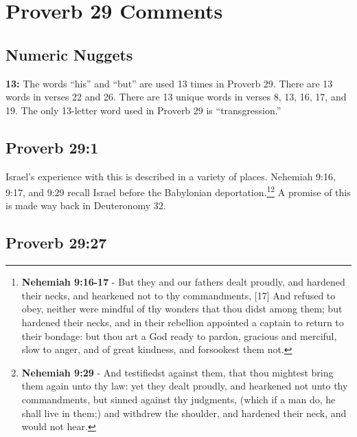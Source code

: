 \section{Proverb 29 Comments}

\subsection{Numeric Nuggets}
\textbf{13:} The words ``his'' and ``but'' are used 13 times in Proverb 29. There are 13 words in verses 22 and 26. There are 13 unique words in verses 8, 13, 16, 17, and 19. The only 13-letter word used in Proverb 29 is ``transgression.''


\subsection{Proverb 29:1}
Israel's experience with this is described in a variety of places. Nehemiah 9:16, 9:17, and 9:29 recall Israel before the Babylonian deportation.\footnote{\textbf{Nehemiah 9:16-17} - But they and our fathers dealt proudly, and hardened their necks, and hearkened not to thy commandments, [17] And refused to obey, neither were mindful of thy wonders that thou didst among them; but hardened their necks, and in their rebellion appointed a captain to return to their bondage: but thou art a God ready to pardon, gracious and merciful, slow to anger, and of great kindness, and forsookest them not.}\footnote{\textbf{Nehemiah 9:29} - And testifiedst against them, that thou mightest bring them again unto thy law: yet they dealt proudly, and hearkened not unto thy commandments, but sinned against thy judgments, (which if a man do, he shall live in them;) and withdrew the shoulder, and hardened their neck, and would not hear.}
A promise of this is made way back in Deuteronomy 32.


\subsection{Proverb 29:27}

